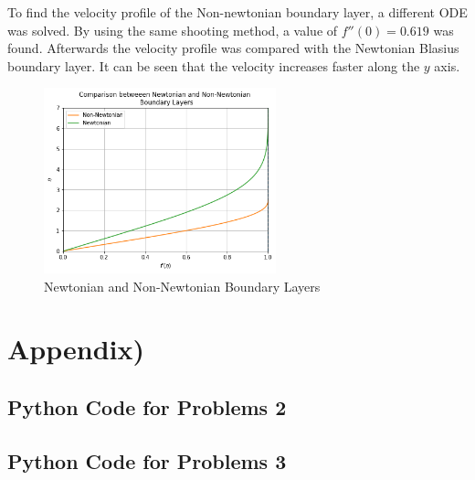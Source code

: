 \documentclass{article}
\begin{document}
To find the velocity profile of the Non-newtonian boundary layer, a different ODE was solved. By using the same shooting method, a value of $f''(0) = 0.619$ was found. Afterwards the velocity profile was compared with the Newtonian Blasius boundary layer. It can be seen that the velocity increases faster along the $y$ axis. 
		
		\begin{figure}[H]
			\centering
			\includegraphics[width=0.6\textwidth]{images/sheesh.png}
			\caption{ Newtonian and Non-Newtonian Boundary Layers }
		\end{figure}

		
		\newpage
		\section*{Appendix)}
			\subsection*{ Python Code for Problems 2 }
			
			\newpage
			\subsection*{ Python Code for Problems 3 }
			
	
\end{document}
